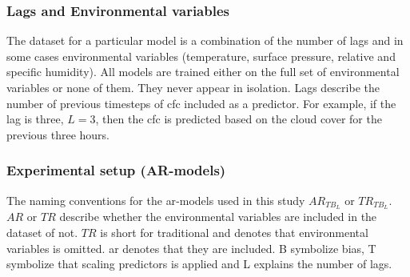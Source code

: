 \subsubsection{Lags and Environmental variables}
The dataset for a particular model is a combination of the number of lags and in some cases environmental variables (temperature, surface pressure, relative and specific humidity). All models are trained either on the full set of environmental variables or none of them. %
They never appear in isolation. Lags describe the number of previous timesteps of \acrshort{cfc} included as a predictor. For example, if the lag is three, $L=3$, then the \acrshort{cfc} is predicted based on the cloud cover for the previous three hours.


\subsubsection{Experimental setup (AR-models)}
The naming conventions for the \acrshort{ar}-models used in this study $AR_{TB_L}$ or $TR_{TB_L}$. $AR$ or $TR$ describe whether the environmental variables are included in the dataset of not. $TR$ is short for traditional and denotes that environmental variables is omitted. \acrshort{ar} denotes that they are included. B symbolize bias, T symbolize that scaling predictors is applied and L explains the number of lags.  

